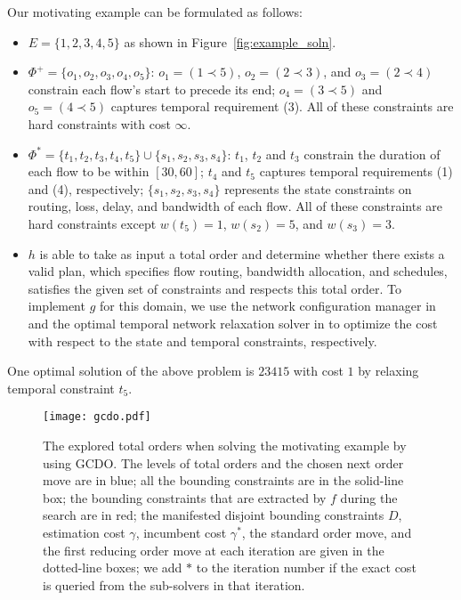 \documentclass[letterpaper]{article} %
\theoremstyle{definition}
\begin{document}
Our motivating example can be formulated as follows:
\begin{itemize}
    \item $E = \{1,2,3,4,5\}$  as shown in Figure~\ref{fig:example_soln}.
    
    \item $\Phi^+ = \{ o_1, o_2, o_3, o_4, o_5 \}$: $o_1 = (1 \prec 5)$, $o_2 = (2 \prec 3)$, and $o_3 = (2 \prec 4)$ constrain each flow's start to precede its end; $o_4 = (3 \prec 5)$ and $o_5 = (4 \prec 5)$ captures temporal requirement (3). All of these constraints are hard constraints with cost $\infty$.
    
    \item $\Phi^* = \{ t_{1}, t_2, t_3, t_4, t_5\} \cup \{ s_1, s_2, s_3, s_4 \}$: $t_1$, $t_2$ and $t_3$ constrain the duration of each flow to be within $[30, 60]$; $t_4$ and $t_5$ captures temporal requirements (1) and (4), respectively; $\{ s_1, s_2, s_3, s_4 \}$ represents the state constraints on routing, loss, delay, and bandwidth of each flow. All of these constraints are hard constraints except $w(t_5) = 1$, $w(s_2) = 5$, and $w(s_3) = 3$.
    
    \item $h$ is able to take as input a total order and determine whether there exists a valid plan,  which specifies flow routing, bandwidth allocation, and schedules, satisfies the given set of constraints and respects this total order. To implement $g$ for this domain, we use the network configuration manager in \cite{chen2018radmax} and the optimal temporal network relaxation solver in \cite{yu2013continuously} to optimize the cost with respect to the state and temporal constraints, respectively. 
    
\end{itemize}

One optimal solution of the above problem is $23415$ with cost $1$ by relaxing temporal constraint $t_5$.



\begin{figure*}[ht]
\vspace{-2pt}
\centering
\texttt{[image: gcdo.pdf]}
\vspace{-10pt}
\caption{The explored total orders when solving the motivating example by using GCDO. The levels of total orders  and the chosen next order move are in blue; all the bounding constraints are in the solid-line box; the bounding constraints that are extracted by $f$ during the search are in red; the manifested disjoint bounding constraints $D$, estimation cost $\gamma$, incumbent cost $\gamma^*$, the standard order move, and the first reducing order move at each iteration are given in the dotted-line boxes; we add $*$ to the iteration number if the exact cost is queried from the sub-solvers in that iteration.}
\label{fig:gcdo}
\vspace{-10pt}
\end{figure*}
\end{document}
